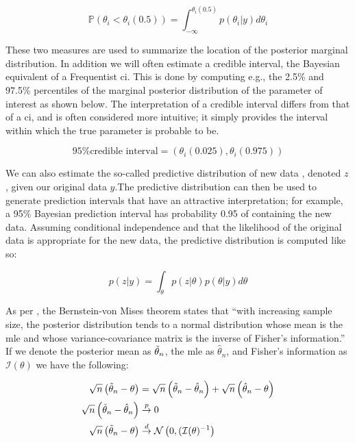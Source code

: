 \documentclass{report}
\begin{document}
\begin{equation}\label{eq:ols-bayes-posterior-median}
    \mathbb{P}(\theta_i < \theta_i(0.5)) = \int_{-\infty}^{\theta_i(0.5)} p(\theta_i | y) d\theta_i
\end{equation}

These two measures are used to summarize the location of the posterior marginal distribution. In addition we will often estimate a credible interval, the Bayesian equivalent of a Frequentist \gls{ci}. This is done by computing e.g., the 2.5\% and 97.5\% percentiles of the marginal posterior distribution of the parameter of interest as shown below. The interpretation of a credible interval differs from that of a \gls{ci}, and is often considered more intuitive; it simply provides the interval within which the true parameter is probable to be. 

\begin{equation}\label{eq:ols-bayes-credible-interval}
    \text{95\% credible interval} = \left(\theta_i(0.025), \theta_i(0.975)\right)
\end{equation}

We can also estimate the so-called predictive distribution of new data , denoted $z$, given our original data $y$.The predictive distribution can then be used to generate prediction intervals that have an attractive interpretation; for example, a 95\% Bayesian prediction interval has probability 0.95 of containing the new data. Assuming conditional independence and that the likelihood of the original data is appropriate for the new data, the predictive distribution is computed like so:

\begin{equation}\label{eq:ols-bayes-predictive-distribution}
    p(z | y) = \int_\theta p(z | \theta) p(\theta | y) d\theta
\end{equation}

As per \cite[Chapter~3.3]{wakefield_bayesian_2013}, the Bernstein-von Mises theorem states that ``with increasing sample size, the posterior distribution tends to a normal distribution whose mean is the \gls{mle} and whose variance-covariance matrix is the inverse of Fisher's information.'' If we denote the posterior mean as $\Tilde{\theta}_n$, the \gls{mle} as $\hat{\theta}_n$, and Fisher's information as $\mathcal{I}(\theta)$ we have the following:

\begin{equation}\label{eq:ols-bayes-posterior-mean-asymptotics}
    \begin{aligned}
        \sqrt{n}\left(\Tilde{\theta}_n - \theta\right) &= \sqrt{n}\left(\Tilde{\theta}_n - \hat{\theta}_n\right) + \sqrt{n}\left(\hat{\theta}_n - \theta\right) \\
        \sqrt{n}\left(\Tilde{\theta}_n - \hat{\theta}_n\right) &\overset{p}{\to} 0 \\
        \sqrt{n}\left(\Tilde{\theta}_n - \theta\right) &\overset{d}{\to} \mathcal{N}\left(0, (\mathcal{I}(\theta)^{-1}\right) \\
    \end{aligned}
\end{equation}
\end{document}
